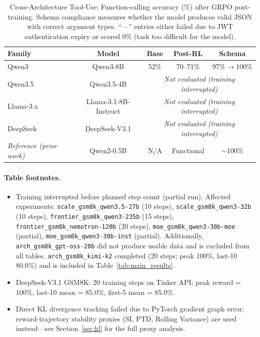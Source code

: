 \documentclass{article}
\begin{document}
\begin{table}[htbp]
\centering
\caption{Cross-Architecture Tool-Use: Function-calling accuracy (\%)
after GRPO post-training. Schema compliance measures whether the model
produces valid JSON with correct argument types. ``---'' entries either
failed due to JWT authentication expiry or scored 0\% (task too
difficult for the model).}
\label{tab:tool_use_cross_arch}
\small
\begin{tabular}{@{}lcccc@{}}
\toprule
\textbf{Family} & \textbf{Model} & \textbf{Base} & \textbf{Post-RL} & \textbf{Schema} \\
\midrule
Qwen3 & Qwen3-8B & 52\% & 70--71\% & 97\%$\to$100\% \\
Qwen3.5 & Qwen3.5-4B & \multicolumn{3}{c}{\textit{Not evaluated (training interrupted)}} \\
Llama-3.x & Llama-3.1-8B-Instruct & \multicolumn{3}{c}{\textit{Not evaluated (training interrupted)}} \\
DeepSeek & DeepSeek-V3.1 & \multicolumn{3}{c}{\textit{Not evaluated (training interrupted)}} \\
\midrule
\textit{Reference (prior work)} & Qwen2-0.5B & N/A & Functional & $\sim$100\% \\
\bottomrule
\end{tabular}
\end{table}

\paragraph{Table footnotes.}
\begin{itemize}
    \item[$^\dagger$] Training interrupted before planned step count (partial run).
    Affected experiments:
    \texttt{scale\_gsm8k\_qwen3.5-27b} (10 steps), \texttt{scale\_gsm8k\_qwen3-32b} (10 steps),
    \texttt{frontier\_gsm8k\_qwen3-235b} (15 steps), \texttt{frontier\_gsm8k\_nemotron-120b} (20 steps),
    \texttt{moe\_gsm8k\_qwen3-30b-moe} (partial), \texttt{moe\_gsm8k\_qwen3-30b-inst} (partial).
    Additionally, \texttt{arch\_gsm8k\_gpt-oss-20b} did not produce usable data and is excluded
    from all tables. \texttt{arch\_gsm8k\_kimi-k2} completed (20 steps; peak 100\%, last-10 80.0\%)
    and is included in Table~\ref{tab:main_results}.
    \item[$^b$] DeepSeek-V3.1 GSM8K: 20 training steps on Tinker API;
    peak reward = 100\%, last-10 mean = 85.0\%, first-5 mean = 85.0\%.
    \item[$^h$] Direct KL divergence tracking failed due to PyTorch gradient graph error;
    reward-trajectory stability proxies (SI, PTD, Rolling Variance) are used
    instead---see Section~\ref{sec:kl} for the full proxy analysis.
\end{itemize}
\end{document}
